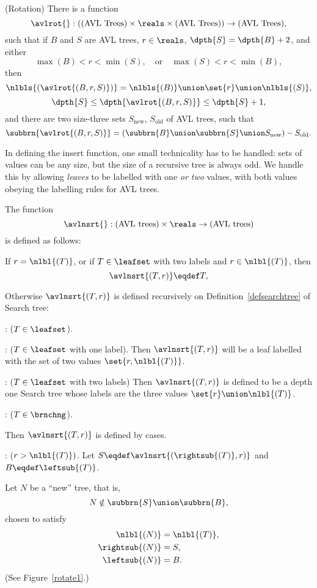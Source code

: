 \begin{definition}
\begin{lemma}(Rotation)\label{lem:rot}
There is a function
\[
\avlrot{}: (\text{(AVL Trees)} \times \reals\times \text{(AVL Trees)}) \to \text{(AVL Trees)},
\]
such that if $B$ and $S$ are AVL trees, $r \in \reals$, $\dpth{S}=\dpth{B}+2$, and either
\[
\max(B) < r < \min(S),\quad \text{or}\quad  \max(S) < r < \min(B),
\]
then
\[
    \nlbls{(\avlrot{(B,r,S)})} = \nlbls{(B)} \union \set{r} \union \nlbls{(S)},
\]
\[
\dpth{S} \leq \dpth{\avlrot{(B,r,S)}} \leq  \dpth{S}+1,
\]
and there are two size-three sets $S_{\text{new}}$, $S_{\text{old}}$
of AVL trees, such that
\[
\subbrn{\avlrot{(B,r,S)}} = (\subbrn{B} \union \subbrn{S} \union S_{\text{new}}) - S_{\text{old}}.
\]
\end{lemma}

In defining the insert function, one small technicality has to be
handled: sets of values can be any size, but the size of a recursive
tree is always odd.  We handle this by allowing \emph{leaves} to be
labelled with one \emph{or two} values, with both values obeying the
labelling rules for AVL trees.

\begin{definition}
The function
\[
\avlnsrt{}: \text{(AVL trees)} \times \reals \to \text{(AVL trees)}
\]
is defined as follows:

If $r = \nlbl{(T)}$, or if $T \in \leafset$ with two labels and $r \in
\nlbl{(T)}$, then
\[
\avlnsrt{(T,r)} \eqdef T,
\]

Otherwise $\avlnsrt{(T,r)}$ is defined recursively on
Definition~\ref{defsearchtree} of Search tree:

: ($T \in \leafset$).

: ($T \in \leafset$ with one label).  Then
$\avlnsrt{(T,r)}$ will be a leaf labelled with the set of two values
$\set{r,\nlbl{(T)}}$.

: ($T \in \leafset$ with two labels) Then
$\avlnsrt{(T,r)}$ is defined to be a depth one Search tree whose
labels are the three values $\set{r} \union \nlbl{(T)}$.

: ($T \in \brnchng$).  

Then $\avlnsrt{(T,r)}$ is defined by cases.

: ($r > \nlbl{(T)})$.  Let $S \eqdef
\avlnsrt{(\rightsub{(T)}, r)}$ and $B \eqdef \leftsub{(T)}$.

Let $N$ be a ``new'' tree, that is,
\[
N \notin \subbrn{S} \union \subbrn{B},
\]
chosen to satisfy
\begin{align}
\nlbl{(N)} & = \nlbl{(T)},\\
\rightsub{(N)} & = S,\\
\leftsub{(N)} & = B.
\end{align}
(See Figure~\ref{rotate1}.)


\end{definition}
\end{definition}

